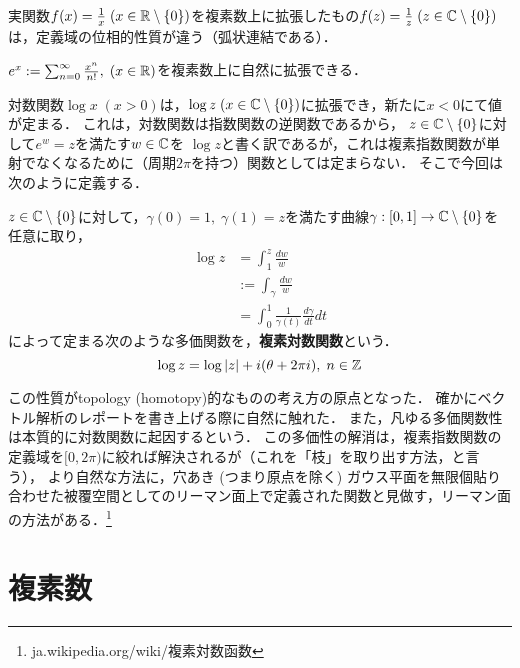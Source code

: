 \documentclass[uplatex, dvipdfmx]{jsreport}
\begin{document}
\begin{example*}[定義域の位相的性質が変わる]
    実関数$f(x)=\frac{1}{x}\;(x\in\mathbb{R}\setminus\{0\})$を複素数上に拡張したもの$f(z)=\frac{1}{z}\;(z\in\mathbb{C}\setminus\{0\})$は，定義域の位相的性質が違う（弧状連結である）．
\end{example*}
\begin{example*}
    $e^x:=\sum^{\infty}_{n=0}\frac{x^n}{n!},\;(x\in\mathbb{R})$を複素数上に自然に拡張できる．
\end{example*}
\begin{example*}[新しく考慮可能になる値が出現する]
    対数関数$\log x\;(x>0)$は，$\log z\;(x\in\mathbb{C}\setminus\{0\})$に拡張でき，新たに$x<0$にて値が定まる．
    これは，対数関数は指数関数の逆関数であるから，
    $z\in\mathbb{C}\setminus\{0\}$に対して$e^w=z$を満たす$w\in\mathbb{C}$を
    $\log z$と書く訳であるが，これは複素指数関数が単射でなくなるために（周期$2\pi$を持つ）関数としては定まらない．
    そこで今回は次のように定義する．

    \begin{definition*}
        $z\in\mathbb{C}\setminus\{0\}$に対して，$\gamma(0)=1,\;\gamma(1)=z$を満たす曲線$\gamma:[0,1]\to\mathbb{C}\setminus\{0\}$を
        任意に取り，
        \begin{align*}
            \log z&=\int^z_1\frac{dw}{w}\\
            &:= \int_\gamma\frac{dw}{w}\\
            &=\int^1_0\frac{1}{\gamma(t)}\frac{d\gamma}{dt}dt
        \end{align*}
        によって定まる次のような多価関数を，\textbf{複素対数関数}という．
        \[ \log z=\log|z| + i(\theta+2\pi i),\;n\in\mathbb{Z} \]
    \end{definition*}
    \begin{remark*}
        この性質がtopology (homotopy)的なものの考え方の原点となった．
        確かにベクトル解析のレポートを書き上げる際に自然に触れた．
        また，凡ゆる多価関数性は本質的に対数関数に起因するという．
        この多価性の解消は，複素指数関数の定義域を$[0,2\pi)$に絞れば解決されるが（これを「枝」を取り出す方法，と言う），
        より自然な方法に，穴あき (つまり原点を除く) ガウス平面を無限個貼り合わせた被覆空間としてのリーマン面上で定義された関数と見做す，リーマン面の方法がある．\footnote{ja.wikipedia.org/wiki/複素対数函数}
    \end{remark*}
\end{example*}

\chapter{複素数}
\end{document}
